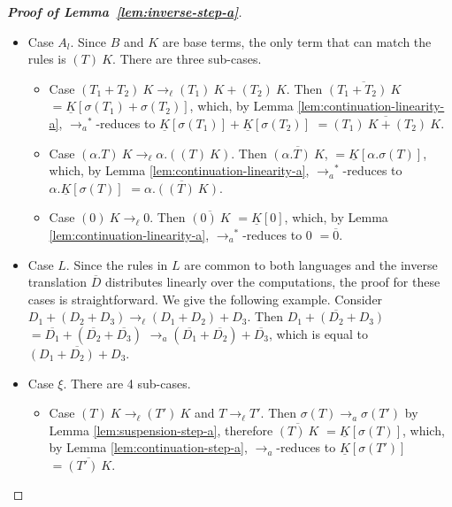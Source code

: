 \documentclass{LMCS}
\newcommand{\xto}[1]{\ensuremath{\rightarrow_{#1}}}
\newcommand{\tolinred}{\xto{\ell}}
\newcommand{\toalgred}{\xto{a}}
\newcommand{\stoalgred}{\ensuremath{\xto{a}^{\ast}}}
\newcommand{\tobv}{\xto{\beta_v}}
\begin{document}
\begin{proof}[\bf Proof of Lemma~\ref{lem:inverse-step-a}]
\begin{itemize}
\begin{itemize}
	\item Case $((\lambda x\,S)~S_{2})~K\tobv (S[x:=S_{2}])~K$. Then $(\lambda x\,\sigma(S))~\sigma(S_{2})\toalgred\sigma(S)[x:=\sigma(S_{2})]$,
	  and
	  $\overline{((\lambda x\,S)~S_{2})~K}$
	  $=\underline{K}[(\lambda x\,\sigma(S))~\sigma(S_{2})]$,
	  which, by Lemma \ref{lem:continuation-step-a}, \tolinred-reduces to
	  $\underline{K}[\sigma(S)[x:=\sigma(S_{2})]]$,
	  which, by Lemma \ref{lem:substitution-lemma-a}, is equal to
	  $\underline{K}[\sigma(S[x:=S_{2}])]$
	  $=\overline{(S[x:=S_{2}])~K}$.
      \end{itemize}
    \item Case $A_{l}$. Since $B$ and $K$ are base terms, the only term that
      can match the rules is $(T)~K$. There are three sub-cases. 
      \begin{itemize}
	\item Case $(T_{1}+T_{2})~K\tolinred (T_{1})~K+(T_{2})~K$. Then 
	  $\overline{(T_{1}+T_{2})~K}$
	  $=\underline{K}[\sigma(T_{1})+\sigma(T_{2})]$,
	  which, by Lemma \ref{lem:continuation-linearity-a}, \stoalgred-reduces to
	  $\underline{K}[\sigma(T_{1})]+\underline{K}[\sigma(T_{2})]$
	  $=\overline{(T_{1})~K+(T_{2})~K}$.
	\item Case $(\alpha.T)~K\tolinred\alpha.((T)~K)$. Then 
	  $\overline{(\alpha.T)~K}$,
	  $=\underline{K}[\alpha.\sigma(T)]$,
	  which, by Lemma \ref{lem:continuation-linearity-a}, \stoalgred-reduces to
	  $\alpha.\underline{K}[\sigma(T)]$
	  $=\overline{\alpha.((T)~K)}$.
	\item Case $(0)~K\tolinred0$. Then 
	  $\overline{(0)~K}$
	  $=\underline{K}[0]$,
	  which, by Lemma \ref{lem:continuation-linearity-a}, \stoalgred-reduces to
	  $0$
	  $=\overline{0}$.
      \end{itemize}
    \item Case $L$. Since the rules in $L$ are common to both languages and
      the inverse translation $\overline{D}$ distributes linearly over
      the computations, the proof for these cases is straightforward. We
      give the following example. Consider $D_{1}+(D_{2}+D_{3})\tolinred(D_{1}+D_{2})+D_{3}$.
      Then
      $\overline{D_{1}+(D_{2}+D_{3})}$
      $=\overline{D_{1}}+(\overline{D_{2}}+\overline{D_{3}})$
      $\toalgred(\overline{D_{1}}+\overline{D_{2}})+\overline{D_{3}}$,
      which is equal to
      $\overline{(D_{1}+D_{2})+D_{3}}$.

    \item Case $\xi$. There are 4 sub-cases.
      \begin{itemize}
	\item Case $(T)~K\tolinred (T')~K$ and $T\tolinred T'$. Then $\sigma(T)\toalgred\sigma(T')$
	  by Lemma \ref{lem:suspension-step-a}, therefore 
	  $\overline{(T)~K}$
	  $=\underline{K}[\sigma(T)]$,
	  which, by Lemma \ref{lem:continuation-step-a}, \toalgred-reduces to
	  $\underline{K}[\sigma(T')]$
	  $=\overline{(T')~K}$.


\end{itemize}
\end{itemize}
\end{proof}
\end{document}
